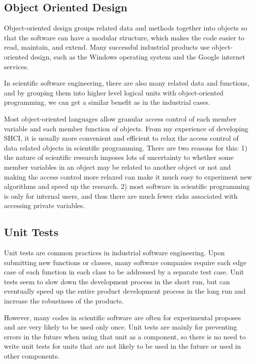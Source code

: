 \subsection{Object Oriented Design}
Object-oriented design groups related data and methods together into objects so that the software can have a modular structure, which makes the code easier to read, maintain, and extend.
Many successful industrial products use object-oriented design, such as the Windows operating system and the Google internet services.

In scientific software engineering, there are also many related data and functions, and by grouping them into higher level logical units with object-oriented programming, we can get a similar benefit as in the industrial cases.

Most object-oriented languages allow granular access control of each member variable and each member function of objects.
From my experience of developing SHCI, it is usually more convenient and efficient to relax the access control of data related objects in scientific programming.
There are two reasons for this:
1) the nature of scientific research imposes lots of uncertainty to whether some member variables in an object may be related to another object or not and making the access control more relaxed can make it much easy to experiment new algorithms and speed up the research.
2) most software in scientific programming is only for internal users, and thus there are much fewer risks associated with accessing private variables.

\subsection{Unit Tests}
Unit tests are common practices in industrial software engineering.
Upon submitting new functions or classes, many software companies require each edge case of each function in each class to be addressed by a separate test case.
Unit tests seem to slow down the development process in the short run, but can eventually speed up the entire product development process in the long run and increase the robustness of the products.

However, many codes in scientific software are often for experimental proposes and are very likely to be used only once.
Unit tests are mainly for preventing errors in the future when using that unit as a component, so there is no need to write unit tests for units that are not likely to be used in the future or used in other components.

